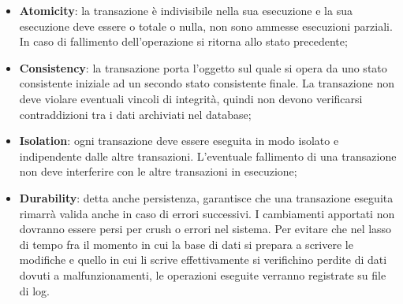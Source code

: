\begin{itemize}
  \item \textbf{Atomicity}: la transazione è indivisibile nella sua esecuzione e
  la sua esecuzione deve essere o totale o nulla, non sono ammesse esecuzioni
  parziali. In caso di fallimento dell'operazione si ritorna allo stato
  precedente;
  \item \textbf{Consistency}: la transazione porta l'oggetto sul quale si opera
  da uno stato consistente iniziale ad un secondo stato consistente finale.
  La transazione non deve violare eventuali vincoli di integrità, quindi non 
  devono verificarsi contraddizioni tra i dati archiviati nel database;
  \item \textbf{Isolation}: ogni transazione deve essere eseguita in modo
  isolato e indipendente dalle altre transazioni. L'eventuale fallimento di una
  transazione non deve interferire con le altre transazioni in esecuzione;  
  \item \textbf{Durability}: detta anche persistenza, garantisce che una
  transazione eseguita rimarrà valida anche in caso di errori successivi. I
  cambiamenti apportati non dovranno essere persi per crush o errori nel
  sistema. Per evitare che nel lasso di tempo fra il momento in cui la base di
  dati si prepara a scrivere le modifiche e quello in cui li scrive
  effettivamente si verifichino perdite di dati dovuti a malfunzionamenti, le
  operazioni eseguite verranno registrate su file di log.
\end{itemize}





